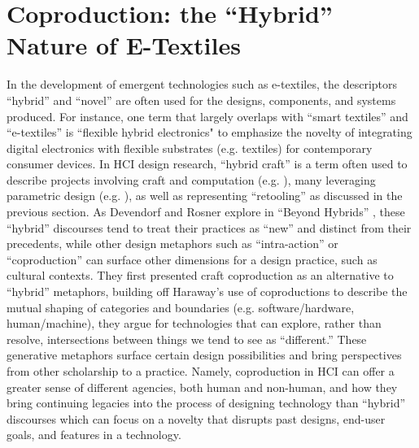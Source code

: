 

\section{Coproduction: the ``Hybrid'' Nature of E-Textiles}

In the development of emergent technologies such as e-textiles, the descriptors ``hybrid'' and ``novel'' are often used for the designs, components, and systems produced. For instance, one term that largely overlaps with ``smart textiles'' and ``e-textiles'' is ``flexible hybrid electronics" \cite{schwartz_flexible_2017} to emphasize the novelty of integrating digital electronics with flexible substrates (e.g. textiles) for contemporary consumer devices. In HCI design research, ``hybrid craft'' is a term often used to describe projects involving craft and computation (e.g. \todo{[comps 26,88,138]}), many leveraging parametric design (e.g. \todo{[44,64,88]}), as well as representing ``retooling'' as discussed in the previous section. As Devendorf and Rosner explore in ``Beyond Hybrids'' \cite{devendorf_beyond_2017}, these ``hybrid'' discourses tend to treat their practices as ``new'' and distinct from their precedents, while other design metaphors such as ``intra-action'' or ``coproduction'' can surface other dimensions for a design practice, such as cultural contexts. They first presented craft coproduction as an alternative to ``hybrid'' metaphors, building off Haraway's use of coproductions to describe the mutual shaping of categories and boundaries (e.g. software/hardware, human/machine), they argue for technologies that can explore, rather than resolve, intersections between things we tend to see as ``different.'' These generative metaphors surface certain design possibilities and bring perspectives from other scholarship to a practice. Namely, coproduction in HCI can offer a greater sense of different agencies, both human and non-human, and how they bring continuing legacies into the process of designing technology than ``hybrid'' discourses which can focus on a novelty that disrupts past designs, end-user goals, and features in a technology.

